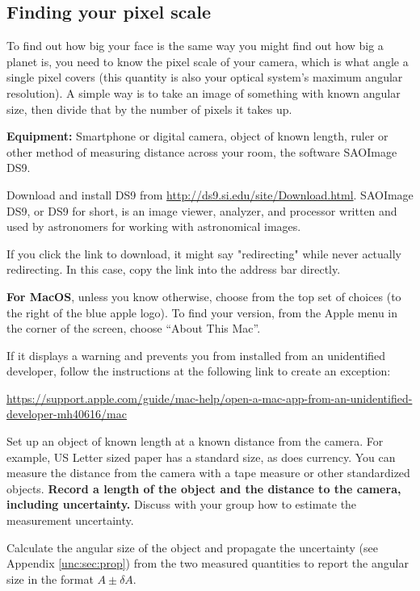 \subsection{Finding your pixel scale}

To find out how big your face is the same way you might find out how big a planet is, you need to know the pixel scale of your camera, which is what angle a single pixel covers (this quantity is also your optical system's maximum angular resolution). A simple way is to take an image of something with known angular size, then divide that by the number of pixels it takes up.

\textbf{Equipment:} Smartphone or digital camera, object of known length, ruler or other method of measuring distance across your room, the software SAOImage DS9.

\begin{steps}
	\item Download and install DS9 from \url{http://ds9.si.edu/site/Download.html}. SAOImage DS9, or DS9 for short, is an image viewer, analyzer, and processor written and used by astronomers for working with astronomical images.
	
	If you click the link to download, it might say "redirecting" while never actually redirecting. In this case, copy the link into the address bar directly.
\begin{framed}	
	\textbf{For MacOS}, unless you know otherwise, choose from the top set of choices (to the right of
	the blue apple logo). To find your version, from the Apple menu in the corner of the screen,
	choose “About This Mac”.
	
	If it displays a warning and prevents you from installed from an unidentified developer, follow the instructions at the following link to create an exception:
	
	\url{https://support.apple.com/guide/mac-help/open-a-mac-app-from-an-unidentified-developer-mh40616/mac}
\end{framed}

	\item Set up an object of known length at a known distance from the camera. For example, US Letter sized paper has a standard size, as does currency. You can measure the distance from the camera with a tape measure or other standardized objects. \textbf{Record a length of the object and the distance to the camera, including uncertainty.} Discuss with your group how to estimate the measurement uncertainty.
	
	\item Calculate the angular size of the object and propagate the uncertainty (see Appendix \ref{unc:sec:prop}) from the two measured quantities to report the angular size in the format $A \pm \delta A$.


\end{steps}
